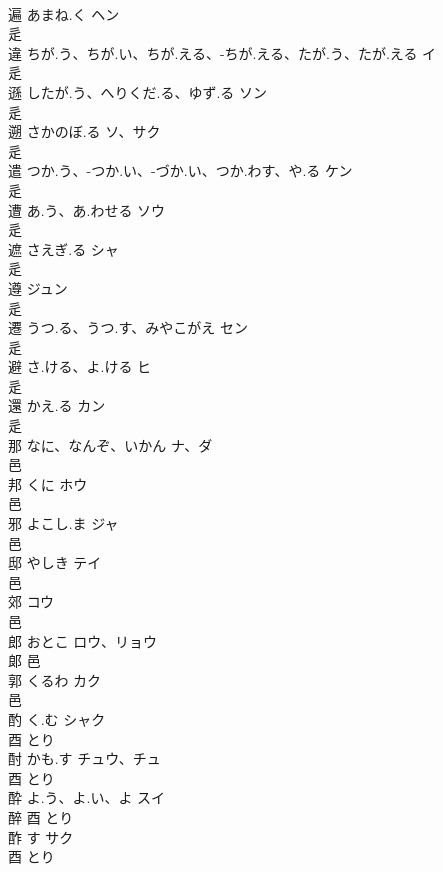 \documentclass[8pt]{extreport}
\begin{document}
\begin{CJK}{UTF8}{min}
\\	遍	あまね.く	ヘン	
\\	辵				
\\	違	ちが.う、ちが.い、ちが.える、-ちが.える、たが.う、たが.える	イ	
\\	辵				
\\	遜	したが.う、へりくだ.る、ゆず.る	ソン	
\\	辵				
\\	遡	さかのぼ.る	ソ、サク	
\\	辵				
\\	遣	つか.う、-つか.い、-づか.い、つか.わす、や.る	ケン	
\\	辵				
\\	遭	あ.う、あ.わせる	ソウ	
\\	辵				
\\	遮	さえぎ.る	シャ	
\\	辵				
\\	遵		ジュン	
\\	辵				
\\	遷	うつ.る、うつ.す、みやこがえ	セン	
\\	辵				
\\	避	さ.ける、よ.ける	ヒ	
\\	辵				
\\	還	かえ.る	カン	
\\	辵				
\\	那	なに、なんぞ、いかん	ナ、ダ	
\\	邑				
\\	邦	くに	ホウ	
\\	邑				
\\	邪	よこし.ま	ジャ	
\\	邑				
\\	邸	やしき	テイ	
\\	邑				
\\	郊		コウ	
\\	邑				
\\	郎	おとこ	ロウ、リョウ	
\\	郞	邑				
\\	郭	くるわ	カク	
\\	邑				
\\	酌	く.む	シャク	
\\	酉		とり		
\\	酎	かも.す	チュウ、チュ	
\\	酉		とり		
\\	酔	よ.う、よ.い、よ	スイ	
\\	醉	酉		とり		
\\	酢	す	サク	
\\	酉		とり		

\end{CJK}
\end{document}
